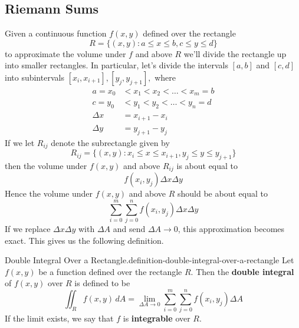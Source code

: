 \documentclass[10pt,]{book}
\newcommand{\terminology}[1]{\textbf{#1}}
\numberwithin{equation}{section}
\begin{document}
\subsection[{Riemann Sums}]{Riemann Sums}\label{subsection-riemann-sums}
\hypertarget{p-1458}{}%
Given a continuous function \(f(x,y)\) defined over the rectangle%
\begin{equation*}
R = \{(x,y) : a\leq x\leq b, c\leq y\leq d\}
\end{equation*}
to approximate the volume under \(f\) and above \(R\) we'll divide the rectangle up into smaller rectangles. In particular, let's divide the intervals \([a,b]\) and \([c,d]\) into subintervals \([x_{i},x_{i+1}], [y_{j},y_{j+1}],\) where%
\begin{align*}
a = x_{0} & < x_{1} < x_{2} < \dots < x_{m} = b \\
c = y_{0} & < y_{1} < y_{2} < \dots < y_{n} = d \\
\Delta x & = x_{i+1} - x_{i} \\
\Delta y & = y_{j+1} - y_{j} 
\end{align*}
If we let \(R_{ij}\) denote the subrectangle given by%
\begin{equation*}
R_{ij} = \{(x,y) : x_{i}\leq x\leq x_{i+1}, y_{j}\leq y\leq y_{j+1}\}
\end{equation*}
then the volume under \(f(x,y)\) and above \(R_{ij}\) is about equal to%
\begin{equation*}
f(x_{i},y_{j})\Delta x\Delta y
\end{equation*}
Hence the volume under \(f(x,y)\) and above \(R\) should be about equal to%
\begin{equation*}
\sum_{i=0}^{m}\sum_{j=0}^{n}f(x_{i},y_{j})\Delta x\Delta y
\end{equation*}
If we replace \(\Delta x\Delta y\) with \(\Delta A\) and send \(\Delta A\to0\), this approximation becomes exact. This gives us the following definition.%
\begin{definition}{Double Integral Over a Rectangle.}{definition-double-integral-over-a-rectangle}%
\hypertarget{p-1459}{}%
Let \(f(x,y)\) be a function defined over the rectangle \(R\). Then the \terminology{double integral} of \(f(x,y)\) over \(R\) is defined to be%
\begin{equation*}
\iint_{R}f(x,y)\,dA = \lim_{\Delta A\to0}\sum_{i=0}^{m}\sum_{j=0}^{n}f(x_{i},y_{j})\Delta A
\end{equation*}
If the limit exists, we say that \(f\) is \terminology{integrable} over \(R\).%
\end{definition}
\end{document}

